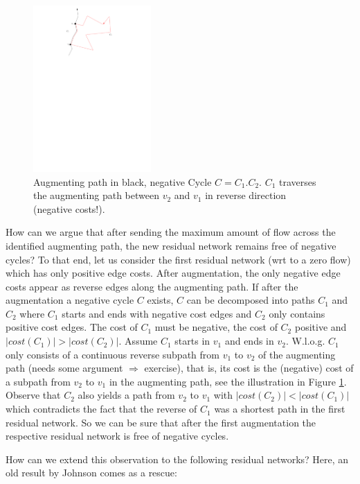 \documentclass{article}
\begin{document}
\begin{figure}
\centering
\includegraphics[width=0.4\textwidth]{Figs/SSP-noNegCyc.pdf}
\caption{Augmenting path in black, negative Cycle $C=C_1.C_2$. $C_1$ traverses the augmenting path between $v_2$ and $v_1$ in reverse direction (negative costs!).}\label{fig:SSPnoNegCyc}
\end{figure}
How can we argue that after sending the maximum amount of flow across the identified augmenting path, the new residual network remains free of negative cycles? To that end, let us consider the first residual network (wrt to a zero flow) which has only positive edge costs. After augmentation, the only negative edge costs appear as reverse edges along the augmenting path. If after the augmentation a negative cycle $C$ exists, $C$ can be decomposed into paths $C_1$ and $C_2$ where $C_1$ starts and ends with negative cost edges and $C_2$ only contains positive cost edges. The cost of $C_1$ must be negative, the cost of $C_2$ positive and $|cost(C_1)|>|cost(C_2)|$. Assume $C_1$ starts in $v_1$ and ends in $v_2$.  W.l.o.g. $C_1$ only consists of a continuous reverse subpath from $v_1$ to $v_2$ of the augmenting path (needs some argument $\Rightarrow$ exercise), that is, its cost is the (negative) cost of a subpath from $v_2$ to $v_1$ in the augmenting path, see the illustration in Figure \ref{fig:SSPnoNegCyc}. Observe that $C_2$ also yields a path from $v_2$ to $v_1$ with $|cost(C_2)|<|cost(C_1)|$ which contradicts the fact that the reverse of $C_1$ was a shortest path in the first residual network. So we can be sure that after the first augmentation the respective residual network is free of negative cycles. 

How can we extend this observation to the following residual networks? Here, an old result by Johnson comes as a rescue:
\end{document}
